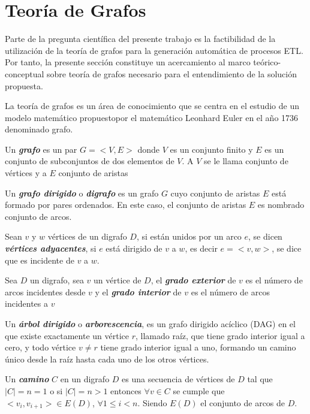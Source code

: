 \section{Teor\'ia de Grafos}\label{section:graphs}

Parte de la pregunta cient\'ifica del presente trabajo es la factibilidad de la utilización de la teoría de 
grafos para la generación automática de procesos ETL. Por tanto, la presente secci\'on constituye un acercamiento 
al marco te\'orico-conceptual sobre teoría de grafos necesario para el entendimiento de la solución propuesta.

La teoría de grafos es un \'area de conocimiento que se centra en el estudio de un modelo matemático 
propuestopor el matemático Leonhard Euler en el año 1736 denominado grafo\cite{estrada2012structure}.

\begin{definition}
    Un \textbf{\textit{grafo}} es un par $G = <V, E>$ donde $V$ es un conjunto finito y $E$ es un 
    conjunto de subconjuntos de dos elementos de $V$. A $V$ se le llama conjunto de v\'ertices y 
    a $E$ conjunto de aristas
\end{definition}

\begin{definition}
    Un \textbf{\textit{grafo dirigido}} o \textbf{\textit{digrafo}} es un grafo $G$ cuyo conjunto de 
    aristas $E$ est\'a formado por pares ordenados. En este caso, el conjunto de aristas $E$ es nombrado 
    conjunto de arcos.
\end{definition}

\begin{definition}
    Sean $v$ y $w$ v\'ertices de un digrafo $D$, si est\'an unidos por un arco $e$, se dicen 
    \textbf{\textit{v\'ertices adyacentes}}, si $e$ est\'a dirigido de $v$ a $w$, es decir $e=<v,w>$, 
    se dice que es incidente de $v$ a $w$.
\end{definition}

\begin{definition}
    Sea $D$ un digrafo, sea $v$ un v\'ertice de $D$, el \textbf{\textit{grado exterior}} de $v$ es el 
    n\'umero de arcos incidentes desde $v$ y el \textbf{\textit{grado interior}} de $v$ es el n\'umero 
    de arcos incidentes a $v$
\end{definition}

\begin{definition}
    Un \textbf{\textit{\'arbol dirigido}} o \textbf{\textit{arborescencia}}, es un 
    grafo dirigido acíclico (DAG) en el que existe exactamente un vértice $r$, llamado raíz, que tiene grado interior 
    igual a cero, y todo v\'ertice $v \neq r$ tiene grado interior igual a uno, formando un camino 
    único desde la raíz hasta cada uno de los otros vértices.
\end{definition}

\begin{definition}
    Un \textbf{\textit{camino}} $C$ en un digrafo $D$ es una secuencia de v\'ertices de $D$ tal que $|C| = n = 1$ 
    o si $|C| = n > 1$ entonces $\forall v \in C$ se cumple que $<v_i , v_{i+1}> \in E(D)$, $\forall 1 \leq i < n$.
    Siendo $E(D)$ el conjunto de arcos de $D$.  
\end{definition}